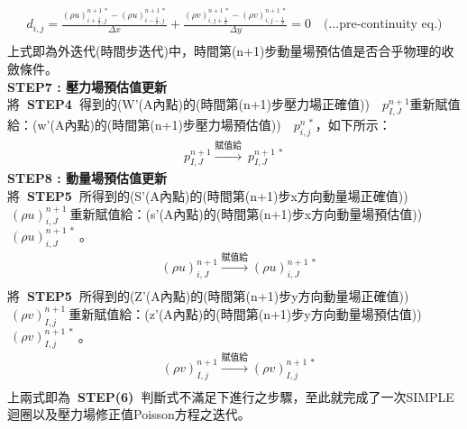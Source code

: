 \documentclass[12pt]{article}
\begin{document}
\begin{equation}\begin{split}
      d_{i,j} = \frac{(\rho u)_{i+\frac{1}{2},j}^{n+1\ *} - (\rho u)_{i-\frac{1}{2},j}^{n+1\ *}}{\Delta x} + \frac{(\rho v)_{i,j+\frac{1}{2}}^{n+1\ *} - (\rho v)_{i,j-\frac{1}{2}}^{n+1\ *}}{\Delta y} = 0 \quad \text{(...pre-continuity eq.)}\\[1.5ex]
\end{split}\end{equation}
\noindent 上式即為外迭代(時間步迭代)中，時間第(n+1)步動量場預估值是否合乎物理的收斂條件。\\[1.5ex]
\textbf{{\color{orange}STEP7 : 壓力場預估值更新}}\\
將\textbf{{\color{red}\ STEP4\ }}得到的(W'(A內點)的(時間第(n+1)步壓力場正確值))$\quad p_{I,J}^{n+1}$重新賦值給：(w'(A內點)的(時間第(n+1)步壓力場預估值))$\quad p_{i,j}^{n\ *}$，如下所示：
\begin{equation}\begin{split}
    p_{I,J}^{n+1} \xrightarrow{\text{賦值給}} \ p_{I,J}^{n+1\ *}
\end{split}\end{equation}
\textbf{{\color{orange}STEP8 : 動量場預估值更新}}\\
\noindent 將\textbf{{\color{red}\ STEP5\ }}所得到的(S'(A內點)的(時間第(n+1)步x方向動量場正確值))$\ (\rho u)_{i,J}^{n+1} \ $重新賦值給：(s'(A內點)的(時間第(n+1)步x方向動量場預估值))$\ (\rho u)_{i,J}^{n+1\ *}\ $。
\begin{equation}\begin{split}
    &(\rho u)_{i,J}^{n+1} \xrightarrow{\text{賦值給}} (\rho u)_{i,J}^{n+1\ *}\\[1.5ex]
\end{split}\end{equation}
\noindent 將\textbf{{\color{red}\ STEP5\ }}所得到的(Z'(A內點)的(時間第(n+1)步y方向動量場正確值))$\ (\rho v)_{I,j}^{n+1} \ $重新賦值給：(z'(A內點)的(時間第(n+1)步y方向動量場預估值))$\ (\rho v)_{I,j}^{n+1\ *}\ $。
\begin{equation}\begin{split}
    &(\rho v)_{I,j}^{n+1} \xrightarrow{\text{賦值給}} (\rho v)_{I,j}^{n+1\ *}\\[1.5ex]
\end{split}\end{equation}
\noindent 上兩式即為\textbf{{\ \color{blue}STEP(6)\ }}判斷式不滿足下進行之步驟，至此就完成了一次SIMPLE迴圈以及壓力場修正值Poisson方程之迭代。\\[1.5ex]
\end{document}
